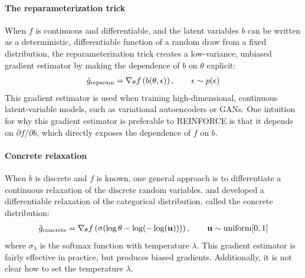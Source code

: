 \documentclass{article}
\newcommand{\vu}{\mathbf{u}}
\begin{document}
\paragraph{The reparameterization trick}
When $f$ is continuous and differentiable, and the latent variables $b$ can be written as a deterministic, differentiable function of a random draw from a fixed distribution, the reparameterization trick \citep{williams1992simple, kingma2013autoencoding, rezende2014stochastic} creates a low-variance, unbiased gradient estimator by making the dependence of $b$ on $\theta$ explicit:
%
\begin{align}
\hat g_\textnormal{reparam} = \nabla_\theta f \left( b(\theta, \epsilon) \right), \qquad \epsilon \sim p(\epsilon)
\end{align}
%
This gradient estimator is used when training high-dimensional, continuous latent-variable models, such as variational autoencoders or GANs.
One intuition for why this gradient estimator is preferable to REINFORCE is that it depends on $\partial f / \partial b$, which directly exposes the dependence of $f$ on $b$.

\paragraph{Concrete relaxation}
When $b$ is discrete and $f$ is known, one general approach is to differentiate a continuous relaxation of the discrete random variables.
\cite{maddison2016concrete} and \cite{jang2016categorical} developed a differentiable relaxation of the categorical distribution, called the concrete distribution:
%
\begin{align}
\hat g_\textnormal{concrete} = \nabla_\theta f \left( \sigma( \log \theta - \log(-\log(\vu))) \right), \qquad \vu \sim \textnormal{uniform}[0, 1] 
\end{align}
%
where $\sigma_\lambda$ is the softmax function with temperature $\lambda$.
This gradient estimator is fairly effective in practice, but produces biased gradients.
Additionally, it is not clear how to set the temperature $\lambda$.



\end{document}
